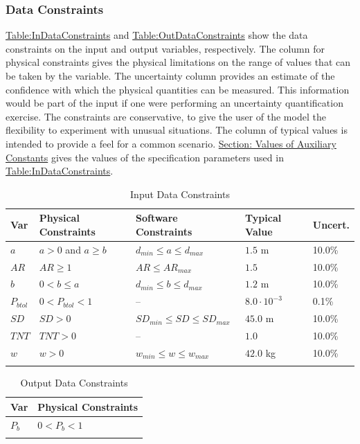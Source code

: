 \documentclass[12pt]{article}
\begin{document}
\subsubsection{Data Constraints}
\label{Sec:DataConstraints}
\hyperref[Table:InDataConstraints]{Table:InDataConstraints} and \hyperref[Table:OutDataConstraints]{Table:OutDataConstraints} show the data constraints on the input and output variables, respectively. The column for physical constraints gives the physical limitations on the range of values that can be taken by the variable. The uncertainty column provides an estimate of the confidence with which the physical quantities can be measured. This information would be part of the input if one were performing an uncertainty quantification exercise. The constraints are conservative, to give the user of the model the flexibility to experiment with unusual situations. The column of typical values is intended to provide a feel for a common scenario. \hyperref[Sec:AuxConstants]{Section: Values of Auxiliary Constants} gives the values of the specification parameters used in \hyperref[Table:InDataConstraints]{Table:InDataConstraints}.
\begin{longtable}{l l l l l}
\toprule
Var & Physical Constraints & Software Constraints & Typical Value & Uncert.
\\
\midrule
$a$ & $a>0$ and $a\geq{}b$ & ${d_{min}}\leq{}a\leq{}{d_{max}}$ & $1.5$ m & 10.0\%
\\
$AR$ & $AR\geq{}1$ & $AR\leq{}{AR_{max}}$ & $1.5$ & 10.0\%
\\
$b$ & $0<b\leq{}a$ & ${d_{min}}\leq{}b\leq{}{d_{max}}$ & $1.2$ m & 10.0\%
\\
${P_{btol}}$ & $0<{P_{btol}}<1$ & -- & $8.0\cdot{}10^{-3}$ & 0.1\%
\\
$SD$ & $SD>0$ & ${SD_{min}}\leq{}SD\leq{}{SD_{max}}$ & $45.0$ m & 10.0\%
\\
$TNT$ & $TNT>0$ & -- & $1.0$ & 10.0\%
\\
$w$ & $w>0$ & ${w_{min}}\leq{}w\leq{}{w_{max}}$ & $42.0$ kg & 10.0\%
\\
\bottomrule
\caption{Input Data Constraints}
\label{Table:InDataConstraints}
\end{longtable}
\begin{longtable}{l l}
\toprule
Var & Physical Constraints
\\
\midrule
${P_{b}}$ & $0<{P_{b}}<1$
\\
\bottomrule
\caption{Output Data Constraints}
\label{Table:OutDataConstraints}
\end{longtable}
\end{document}
